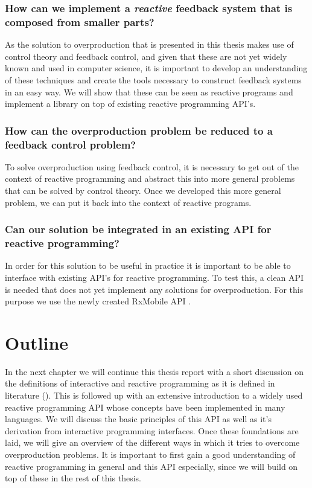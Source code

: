 \subsubsection*{How can we implement a \emph{reactive} feedback system that is composed from smaller parts?} 
As the solution to overproduction that is presented in this thesis makes use of control theory and feedback control, and given that these are not yet widely known and used in computer science, it is important to develop an understanding of these techniques and create the tools necessary to construct feedback systems in an easy way. We will show that these can be seen as reactive programs and implement a library on top of existing reactive programming API's.

\subsubsection*{How can the overproduction problem be reduced to a feedback control problem?}
To solve overproduction using feedback control, it is necessary to get out of the context of reactive programming and abstract this into more general problems that can be solved by control theory. Once we developed this more general problem, we can put it back into the context of reactive programs.

\subsubsection*{Can our solution be integrated in an existing API for reactive programming?}
In order for this solution to be useful in practice it is important to be able to interface with existing API's for reactive programming. To test this, a clean API is needed that does not yet implement any solutions for overproduction. For this purpose we use the newly created RxMobile API \cite{RxMobile}.

\section*{Outline}
In the next chapter we will continue this thesis report with a short discussion on the definitions of interactive and reactive programming as it is defined in literature (). This is followed up with an extensive introduction to a widely used reactive programming API whose concepts have been implemented in many languages. We will discuss the basic principles of this API as well as it's derivation from interactive programming interfaces. Once these foundations are laid, we will give an overview of the different ways in which it tries to overcome overproduction problems. It is important to first gain a good understanding of reactive programming in general and this API especially, since we will build on top of these in the rest of this thesis.

